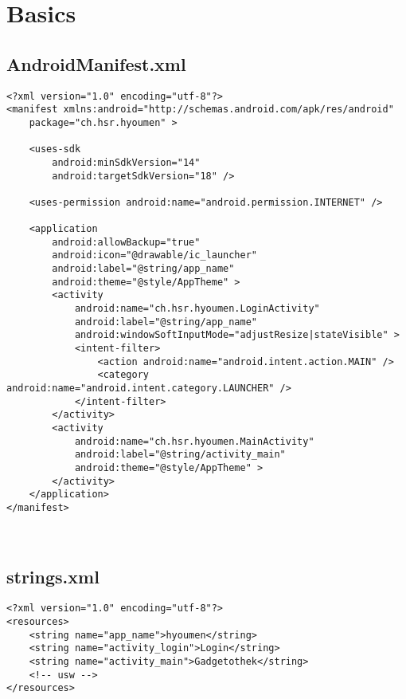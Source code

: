 \documentclass{report}
\begin{document}
\lstset{language=xml}

\section*{Basics}

\subsection*{AndroidManifest.xml}
\begin{lstlisting}
<?xml version="1.0" encoding="utf-8"?>
<manifest xmlns:android="http://schemas.android.com/apk/res/android" 
	package="ch.hsr.hyoumen" >

	<uses-sdk
		android:minSdkVersion="14"
		android:targetSdkVersion="18" />

	<uses-permission android:name="android.permission.INTERNET" />
	
	<application
		android:allowBackup="true"
		android:icon="@drawable/ic_launcher"
		android:label="@string/app_name"
		android:theme="@style/AppTheme" >
		<activity 
			android:name="ch.hsr.hyoumen.LoginActivity"
			android:label="@string/app_name"
			android:windowSoftInputMode="adjustResize|stateVisible" >
			<intent-filter>
				<action android:name="android.intent.action.MAIN" />
				<category android:name="android.intent.category.LAUNCHER" />
			</intent-filter>
		</activity>
		<activity
			android:name="ch.hsr.hyoumen.MainActivity"
			android:label="@string/activity_main"
			android:theme="@style/AppTheme" >
		</activity>
	</application>
</manifest>
\end{lstlisting}
~\par
\subsection*{strings.xml}

\begin{lstlisting}
<?xml version="1.0" encoding="utf-8"?>
<resources>
	<string name="app_name">hyoumen</string>
	<string name="activity_login">Login</string>
	<string name="activity_main">Gadgetothek</string>
	<!-- usw -->
</resources>
\end{lstlisting}

\newpage
\end{document}
